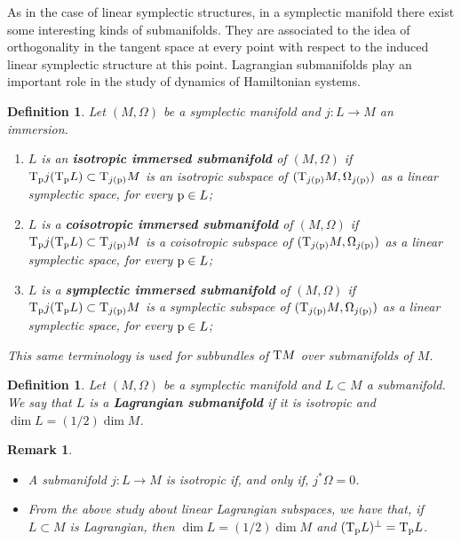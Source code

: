\documentclass[12pt]{report}
\newtheorem{definition}[teor]{Definition}
\newtheorem{remark}[teor]{Remark}
\def\bit{\begin{itemize}}
\def\eit{\end{itemize}}
\def\Tan{{\rm T}}
\begin{document}
As in the case of linear symplectic structures, in a symplectic manifold there exist some interesting kinds of submanifolds. They are associated to the idea of orthogonality in the tangent space at every point with respect to the induced linear symplectic structure at this point. Lagrangian submanifolds play an important role in the study of dynamics of Hamiltonian systems.

\begin{definition}
Let $(M,\Omega)$ be a symplectic manifold and $j:L\to M$ an immersion.
\begin{enumerate}
\item 
$L$ is an \textbf{isotropic immersed submanifold} of $(M,\Omega)$ if
$\Tan_{\rm p}j(\Tan_{\rm p}L)\subset\Tan_{j(\rm p)}M$ is an isotropic subspace of 
$(\Tan_{j(\rm p)}M,\Omega_{j(\rm p)})$ as a linear symplectic space, for every ${\rm p}\in L$;
\item
$L$ is a \textbf{coisotropic immersed  submanifold} of $(M,\Omega)$ if
$\Tan_{\rm p}j(\Tan_{\rm p}L)\subset\Tan_{j(\rm p)}M$ is a coisotropic subspace of 
$(\Tan_{j(\rm p)}M,\Omega_{j(\rm p)})$ as a linear symplectic space, for every ${\rm p}\in L$;
\item
$L$ is a \textbf{symplectic immersed submanifold} of $(M,\Omega)$ if
$\Tan_{\rm p}j(\Tan_{\rm p}L)\subset\Tan_{j(\rm p)}M$ is a symplectic subspace of 
$(\Tan_{j(\rm p)}M,\Omega_{j(\rm p)})$ as a linear symplectic space, for every ${\rm p}\in L$;
\end{enumerate}
This same terminology is used for subbundles of $\Tan M$ over submanifolds of $M$.
\end{definition}

\begin{definition} 
Let $(M,\Omega)$ be a symplectic manifold and $L\subset M$ a submanifold. We say that $L$ is a \textbf{Lagrangian submanifold}  if it is isotropic and $\dim L=(1/2)\dim M$.\end{definition}

\begin{remark}{\rm 
\bit
\item 
A submanifold
$j\colon L\to M$ is isotropic if, and only if, $j^{*}\Omega=0$.
\item 
From the above study about linear Lagrangian subspaces, we have that, if $L\subset M$ is Lagrangian, then $\dim L=(1/2)\dim M$ and $(\Tan_{\rm p}L)^{\bot}=\Tan_{\rm p}L$.
\eit
}\end{remark}
\end{document}
